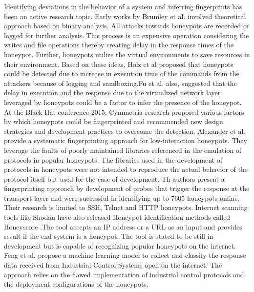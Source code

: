 \documentclass[letterpaper, 10 pt, conference]{ieeeconf}  %
\begin{document}
Identifying deviations in the behavior of a system and inferring fingerprints has been an active research topic. Early works by Brumley et al. \cite{Brumley} involved theoretical approach based on binary analysis. All attacks towards honeypots are recorded or logged for further analysis. This process is an expensive operation considering the writes and file operations thereby creating delay in the response times of the honeypot. Further, honeypots utilize the virtual environments to save resources in their environment. Based on these ideas, Holz et al \cite{Holz} proposed that honeypots could be detected due to increase in execution time of the commands from the attackers because of logging and sandboxing.Fu et al. \cite{Fu} also, suggested that the delay in execution and the response due to the virtualized network layer leveraged by honeypots could be a factor to infer the presence of the honeypot. At the Black Hat conference 2015, Cymmetria research \cite{BLACKHAT} proposed various factors by which honeypots could be fingerprinted and recommended new design strategies and development practices to overcome the detection. Alexander et al. \cite{Vetterl2018} provide a systematic fingerprinting approach for low-interaction honeypots. They leverage the faults of poorly maintained libraries referenced in the emulation of protocols in popular honeypots. The libraries used in the development of protocols in honeypots were not intended to reproduce the actual behavior of the protocol itself but used for the ease of development. Th authors present a fingerprinting approach by development of probes that trigger the response at the transport layer and were successful in identifying up to 7605 honeypots online. Their research is limited to SSH, Telnet and HTTP honeypots. Internet scanning tools like Shodan have also released Honeypot identification methods called Honeyscore \cite{SHODAN}.The tool accepts an IP address or a URL as an input and provides result if the end system is a honeypot. The tool is stated to be still in development but is capable of recognizing popular honeypots on the internet. Feng et al. \cite{Feng2016} propose a machine learning model to collect and classify the response data received from Industrial Control Systems open on the internet. The approach relies on the flawed implementation of industrial control protocols and the deployment configurations of the honeypots. 
\end{document}
